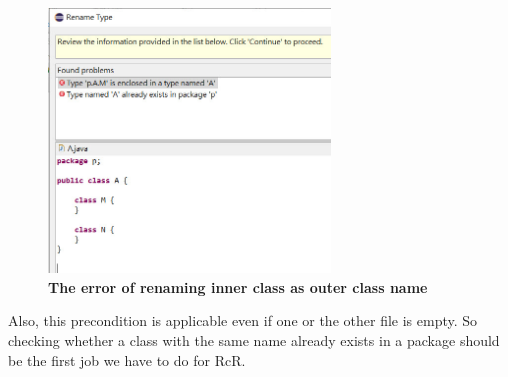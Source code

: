 \begin{figure}[H]
\centerline{\includegraphics[width=75mm,scale=0.4]{NC3.jpg}}
\caption{\textbf{The error of renaming inner class as outer class name}}
\label{fig:NC3}
\end{figure}


Also, this precondition is applicable even if one or the other file is empty. So checking whether a class with the same name already exists in a package should be the first job we have to do for RcR. 
   
